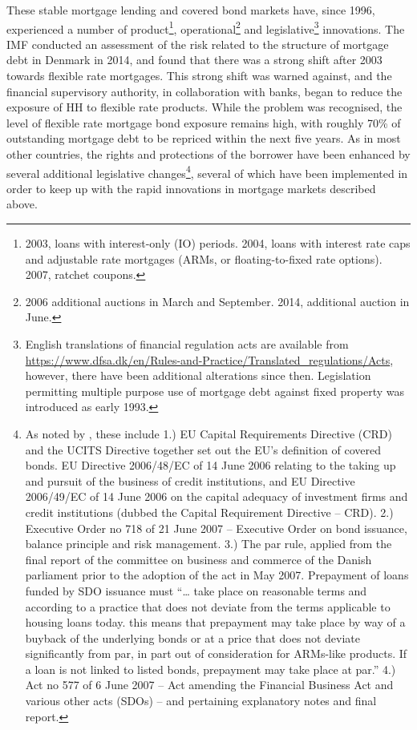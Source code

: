 \documentclass[
]{book}
\begin{document}
These stable mortgage lending and covered bond markets have, since 1996, experienced
a number of product\footnote{2003, loans with interest-only (IO) periods. 2004, loans with interest
  rate caps and adjustable rate mortgages (ARMs, or floating-to-fixed rate options). 2007, ratchet coupons.}, operational\footnote{2006 additional auctions in March and September. 2014, additional
  auction in June.} and
legislative\footnote{English translations of financial regulation acts are available
  from \url{https://www.dfsa.dk/en/Rules-and-Practice/Translated_regulations/Acts}, however, there
  have been additional alterations since then. Legislation permitting multiple purpose use
  of mortgage debt against fixed property was introduced as early 1993.} innovations. The IMF \citep{sheehy2014} conducted an
assessment of the risk related to the structure of mortgage debt in Denmark in 2014,
and found that there was a strong shift after 2003 towards flexible rate mortgages. This
strong shift was warned against, and the financial supervisory authority, in collaboration
with banks, began to reduce the exposure of HH to flexible rate products. While the problem
was recognised, the level of flexible rate mortgage bond exposure remains high, with roughly 70\%
of outstanding mortgage debt to be repriced within the next five years. As in most other countries,
the rights and protections of the borrower have been enhanced by several additional legislative
changes\footnote{As noted by \citet[pp.~12]{laustsen2009}, these include 1.) EU Capital Requirements
  Directive (CRD) and the UCITS Directive together set out the EU's
  definition of covered bonds. EU Directive 2006/48/EC of 14 June 2006 relating to the taking
  up and pursuit of the business of credit institutions, and EU Directive 2006/49/EC of 14 June 2006
  on the capital adequacy of investment firms and credit institutions (dubbed the Capital
  Requirement Directive -- CRD).
  2.) Executive Order no 718 of 21 June 2007 -- Executive Order on bond issuance, balance
  principle and risk management.
  3.) The par rule, applied from the final report of the committee on business and commerce of
  the Danish parliament prior to the adoption of the act in May 2007. Prepayment of loans funded
  by SDO issuance must ``\ldots{} take place on reasonable terms and according to a practice that does
  not deviate from the terms applicable to housing loans today. this means that prepayment may
  take place by way of a buyback of the underlying bonds or at a price that does not deviate
  significantly from par, in part out of consideration for ARMs-like products. If a loan is not
  linked to listed bonds, prepayment may take place at par.''
  4.) Act no 577 of 6 June 2007 -- Act amending the Financial Business Act and various other acts
  (SDOs) -- and pertaining explanatory notes and final report.}, several of which have been implemented in order to keep up with
the rapid innovations in mortgage markets described above.
\end{document}
